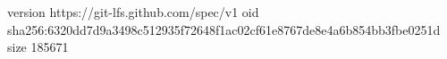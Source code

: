 version https://git-lfs.github.com/spec/v1
oid sha256:6320dd7d9a3498c512935f72648f1ac02cf61e8767de8e4a6b854bb3fbe0251d
size 185671
